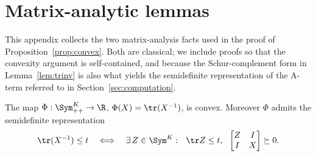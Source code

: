 \section{Matrix-analytic lemmas}
\label{app:matrix}

This appendix collects the two matrix-analysis facts used in the proof of
Proposition~\ref{prop:convex}. Both are classical; we include proofs so that the
convexity argument is self-contained, and because the Schur-complement form in
Lemma~\ref{lem:trinv} is also what yields the semidefinite representation of the
A-term referred to in Section~\ref{sec:computation}.

\begin{lemma}
\label{lem:trinv}
The map $\Phi:\Sym^{K}_{++}\to\R$, $\Phi(X)=\tr(X^{-1})$, is convex. Moreover
$\Phi$ admits the semidefinite representation
\begin{equation}
  \tr(X^{-1})\le t
  \quad\Longleftrightarrow\quad
  \exists\,Z\in\Sym^{K}:\ \ \tr Z\le t,\ \
  \begin{bmatrix} Z & I\\ I & X\end{bmatrix}\succeq0 .
  \label{eq:schur}
\end{equation}
\end{lemma}

